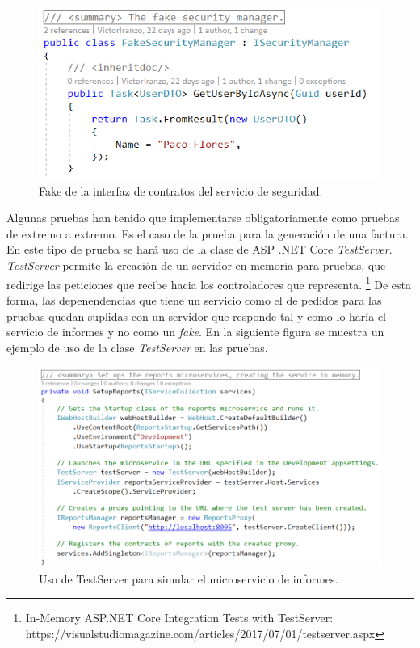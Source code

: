 \documentclass[11pt,spanish,listoffigures]{tfgetsinf}
\begin{document}
\begin{figure}[h]
\centering
\includegraphics[scale=0.8]{FakeSecurityManager}
\caption{Fake de la interfaz de contratos del servicio de seguridad.}
\label{fig:FakeSecurityManager}
\end{figure}

Algunas pruebas han tenido que implementarse obligatoriamente como pruebas de extremo a extremo. Es el caso de la prueba para la generación de una factura. En este tipo de prueba se hará uso de la clase de ASP .NET Core \textit{TestServer}. \textit{TestServer} permite la creación de un servidor en memoria para pruebas, que redirige las peticiones que recibe hacia los controladores que representa. \footnote{ In-Memory ASP.NET Core Integration Tests with TestServer: https://visualstudiomagazine.com/articles/2017/07/01/testserver.aspx} De esta forma, las depenendencias que tiene un servicio como el de pedidos para las pruebas quedan suplidas con un servidor que responde tal y como lo haría el servicio de informes y no como un \textit{fake}. En la siguiente figura se muestra un ejemplo de uso de la clase \textit{TestServer} en las pruebas.

\begin{figure}[h]
\centering
\includegraphics[scale=0.7]{TestServer}
\caption{Uso de TestServer para simular el microservicio de informes.}
\end{figure}
\end{document}
